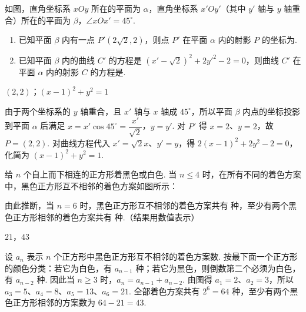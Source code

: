\begin{problem}
如图，直角坐标系 \(xOy\) 所在的平面为 \(\alpha\)，直角坐标系 \(x'Oy'\)（其中 \(y'\) 轴与 \(y\) 轴重合）所在的平面为 \(\beta\)，\(\angle xOx'=45^\circ\).

\begin{enumerate}
\item 已知平面 \(\beta\) 内有一点 \(P'\left(2\sqrt{2},2\right)\)，则点 \(P'\) 在平面 \(\alpha\) 内的射影 \(P\) 的坐标为\fillinblank{}.
\item 已知平面 \(\beta\) 内的曲线 \(C'\) 的方程是 \(\left(x'-\sqrt{2}\right)^2+2y'^2-2=0\)，则曲线 \(C'\) 在平面 \(\alpha\) 内的射影 \(C\) 的方程是\fillinblank{}.
\end{enumerate}

\end{problem}

\begin{answer}
\(\left(2,2\right)\)；\(\left(x-1\right)^2+y^2=1\)
\end{answer}

\begin{solution}
由于两个坐标系的 \(y\) 轴重合，且 \(x'\) 轴与 \(x\) 轴成 \(45^\circ\)，所以平面 \(\beta\) 内点的坐标投影到平面 \(\alpha\) 后满足 \(x=x'\cos45^\circ=\dfrac{x'}{\sqrt{2}}\)，\(y=y'\). 对 \(P'\) 得 \(x=2\)、\(y=2\)，故 \(P=\left(2,2\right)\). 对曲线方程代入 \(x'=\sqrt{2}x\)、\(y'=y\)，得 \(2(x-1)^2+2y^2-2=0\)，化简为 \(\left(x-1\right)^2+y^2=1\).
\end{solution}

\begin{problem}
给 \(n\) 个自上而下相连的正方形着黑色或白色. 当 \(n\leqslant4\) 时，在所有不同的着色方案中，黑色正方形互不相邻的着色方案如图所示：

由此推断，当 \(n=6\) 时，黑色正方形互不相邻的着色方案共有\fillinblank{} 种，至少有两个黑色正方形相邻的着色方案共有\fillinblank{} 种.（结果用数值表示）
{\problemresetlayout{}}
\end{problem}

\begin{answer}
\(21\)，\(43\)
\end{answer}

\begin{solution}
设 \(a_n\) 表示 \(n\) 个正方形中黑色正方形互不相邻的着色方案数. 按最下面一个正方形的颜色分类：若它为白色，有 \(a_{n-1}\) 种；若它为黑色，则倒数第二个必须为白色，有 \(a_{n-2}\) 种. 因此当 \(n\geqslant3\) 时，\(a_n=a_{n-1}+a_{n-2}\). 由图得 \(a_1=2\)、\(a_2=3\)，所以 \(a_3=5\)、\(a_4=8\)、\(a_5=13\)、\(a_6=21\). 全部着色方案共有 \(2^6=64\) 种，至少有两个黑色正方形相邻的方案数为 \(64-21=43\).
\end{solution}

